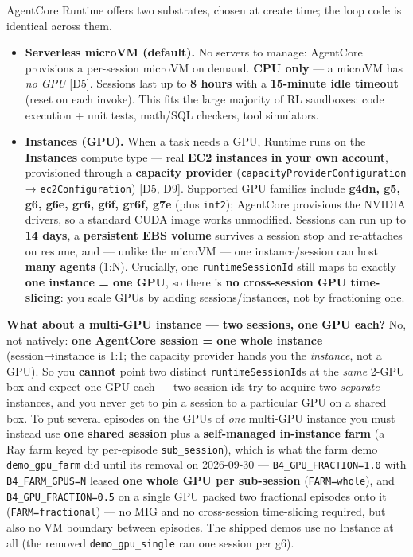 \documentclass[
  paper=a4,
  ,captions=tableheading
]{scrartcl}
\providecommand{\tightlist}{%
  \setlength{\itemsep}{0pt}\setlength{\parskip}{0pt}}
\renewenvironment{quote}{\begin{customblockquote}\list{}{\rightmargin=0em\leftmargin=0em}%
\item\relax\color{blockquote-text}\ignorespaces}{\unskip\unskip\endlist\end{customblockquote}}
\begin{document}
AgentCore Runtime offers two substrates, chosen at create time; the loop
code is identical across them.

\begin{itemize}
\tightlist
\item
  \textbf{Serverless microVM (default).} No servers to manage: AgentCore
  provisions a per-session microVM on demand. \textbf{CPU only} --- a
  microVM has \emph{no GPU} {[}D5{]}. Sessions last up to \textbf{8
  hours} with a \textbf{15-minute idle timeout} (reset on each invoke).
  This fits the large majority of RL sandboxes: code execution + unit
  tests, math/SQL checkers, tool simulators.
\item
  \textbf{Instances (GPU).} When a task needs a GPU, Runtime runs on the
  \textbf{Instances} compute type --- real \textbf{EC2 instances in your
  own account}, provisioned through a \textbf{capacity provider}
  (\texttt{capacityProviderConfiguration} → \texttt{ec2Configuration})
  {[}D5, D9{]}. Supported GPU families include \textbf{g4dn, g5, g6,
  g6e, gr6, g6f, gr6f, g7e} (plus \texttt{inf2}); AgentCore provisions
  the NVIDIA drivers, so a standard CUDA image works unmodified.
  Sessions can run up to \textbf{14 days}, a \textbf{persistent EBS
  volume} survives a session stop and re-attaches on resume, and ---
  unlike the microVM --- one instance/session can host \textbf{many
  agents} (1:N). Crucially, one \texttt{runtimeSessionId} still maps to
  exactly \textbf{one instance = one GPU}, so there is \textbf{no
  cross-session GPU time-slicing}: you scale GPUs by adding
  sessions/instances, not by fractioning one.
\end{itemize}

\begin{quote}
\textbf{What about a multi-GPU instance --- two sessions, one GPU each?}
No, not natively: \textbf{one AgentCore session = one whole instance}
(session→instance is 1:1; the capacity provider hands you the
\emph{instance}, not a GPU). So you \textbf{cannot} point two distinct
\texttt{runtimeSessionId}s at the \emph{same} 2-GPU box and expect one
GPU each --- two session ids try to acquire two \emph{separate}
instances, and you never get to pin a session to a particular GPU on a
shared box. To put several episodes on the GPUs of \emph{one} multi-GPU
instance you must instead use \textbf{one shared session} plus a
\textbf{self-managed in-instance farm} (a Ray farm keyed by per-episode
\texttt{sub\_session}), which is what the farm demo
\texttt{demo\_gpu\_farm} did until its removal on 2026-09-30 ---
\texttt{B4\_GPU\_FRACTION=1.0} with \texttt{B4\_FARM\_GPUS=N} leased
\textbf{one whole GPU per sub-session} (\texttt{FARM=whole}), and
\texttt{B4\_GPU\_FRACTION=0.5} on a single GPU packed two fractional
episodes onto it (\texttt{FARM=fractional}) --- no MIG and no
cross-session time-slicing required, but also no VM boundary between
episodes. The shipped demos use no Instance at all (the removed
\texttt{demo\_gpu\_single} ran one session per g6).
\end{quote}
\end{document}
